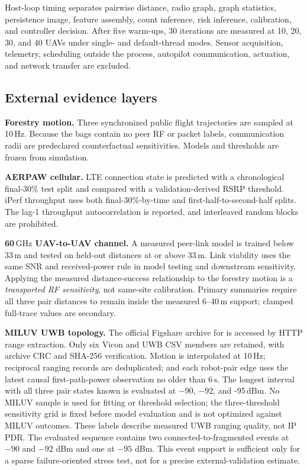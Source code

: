 \documentclass[final,5p,times,twocolumn]{elsarticle}
\newcommand{\SI}[2]{#1\,\ensuremath{\mathrm{#2}}}
\begin{document}
Host-loop timing separates pairwise distance, radio graph, graph statistics, persistence
image, feature assembly, count inference, risk inference, calibration, and controller
decision. After five warm-ups, 30 iterations are measured at 10, 20, 30, and 40 UAVs under
single- and default-thread modes. Sensor acquisition, telemetry, scheduling outside the
process, autopilot communication, actuation, and network transfer are excluded.

\subsection{External evidence layers}

\textbf{Forestry motion.} Three synchronized public flight trajectories are sampled at
\SI{10}{Hz}. Because the bags contain no peer RF or packet labels, communication radii are
predeclared counterfactual sensitivities. Models and thresholds are frozen from simulation.

\textbf{AERPAW cellular.} LTE connection state is predicted with a chronological final-30\%
test split and compared with a validation-derived RSRP threshold. iPerf throughput uses
both final-30\%-by-time and first-half-to-second-half splits. The lag-1 throughput
autocorrelation is reported, and interleaved random blocks are prohibited.

\textbf{\SI{60}{GHz} UAV-to-UAV channel.} A measured peer-link model is trained below
\SI{33}{m} and tested on held-out distances at or above \SI{33}{m}. Link viability uses
the same SNR and received-power rule in model testing and downstream sensitivity.
Applying the measured distance-success relationship to the forestry motion is a
\emph{transported RF sensitivity}, not same-site calibration. Primary summaries require
all three pair distances to remain inside the measured 6--\SI{40}{m} support; clamped
full-trace values are secondary.

\textbf{MILUV UWB topology.} The official Figshare archive for
 is accessed by HTTP range extraction. Only six Vicon
and UWB CSV members are retained, with archive CRC and SHA-256 verification. Motion is
interpolated at \SI{10}{Hz}; reciprocal ranging records are deduplicated; and each
robot-pair edge uses the latest causal first-path-power observation no older than
\SI{6}{s}. The longest interval with all three pair states known is evaluated at
$-90$, $-92$, and \SI{-95}{dBm}. No MILUV sample is used for fitting or threshold
selection; the three-threshold sensitivity grid is fixed before model evaluation and is
not optimized against MILUV outcomes. These labels describe measured UWB ranging quality,
not IP PDR. The evaluated sequence contains two connected-to-fragmented events at
$-90$ and $-92$ dBm and one at $-95$ dBm. This event support is sufficient only for a
sparse failure-oriented stress test, not for a precise external-validation estimate.
\end{document}
